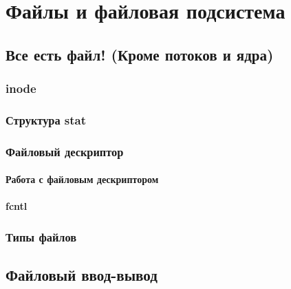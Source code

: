 \documentclass[oneside]{book}
\begin{document}
	

\part{Файлы и файловая подсистема}
%
	
	\chapter{Все есть файл! (Кроме потоков и ядра)}
	
	
		\section{inode}
		
		
			\section{Структура stat}
			
			
		\section{Файловый дескриптор}
		
			
			\subsection{Работа с файловым дескриптором}
			
			
			\subsection{fcntl}
			
	
		\section{Типы файлов}
		
		
	\chapter{Файловый ввод-вывод}
	
	
\end{document}
